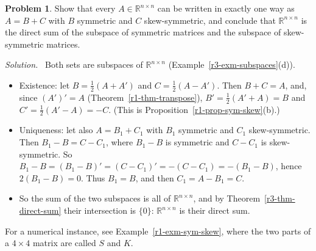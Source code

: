 \documentclass[12pt]{article}
\newcommand{\R}{\mathbb R}
\theoremstyle{definition}
\newtheorem{problem}{Problem}
\newenvironment{solution}{\par\noindent\textit{Solution.}\ }{\par\smallskip}
\begin{document}
\begin{problem}\label{r3-ex-sym-skew}
Show that every \(A\in\R^{n\times n}\) can be written in exactly one way as \(A=B+C\) with \(B\)
symmetric and \(C\) skew-symmetric, and conclude that \(\R^{n\times n}\) is the direct sum of the
subspace of symmetric matrices and the subspace of skew-symmetric matrices.
\end{problem}
\begin{solution}
Both sets are subspaces of \(\R^{n\times n}\) (Example~\ref{r3-exm-subspaces}(d)).
\begin{itemize}
\item Existence: let \(B=\frac12(A+A')\) and \(C=\frac12(A-A')\). Then \(B+C=A\), and, since
\((A')'=A\) (Theorem~\ref{r1-thm-transpose}), \(B'=\frac12(A'+A)=B\) and
\(C'=\frac12(A'-A)=-C\). (This is Proposition~\ref{r1-prop-sym-skew}(b).)
\item Uniqueness: let also \(A=B_1+C_1\) with \(B_1\) symmetric and \(C_1\) skew-symmetric. Then
\(B_1-B=C-C_1\), where \(B_1-B\) is symmetric and \(C-C_1\) is skew-symmetric. So
\(B_1-B=(B_1-B)'=(C-C_1)'=-(C-C_1)=-(B_1-B)\), hence \(2(B_1-B)=0\). Thus \(B_1=B\), and then
\(C_1=A-B_1=C\).
\item So the sum of the two subspaces is all of \(\R^{n\times n}\), and by
Theorem~\ref{r3-thm-direct-sum} their intersection is \(\{0\}\): \(\R^{n\times n}\) is their
direct sum.
\end{itemize}
For a numerical instance, see Example~\ref{r1-exm-sym-skew}, where the two parts of a \(4\times4\) matrix are
called \(S\) and \(K\).
\end{solution}
\end{document}
